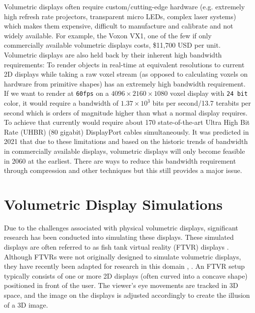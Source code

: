 Volumetric displays often require custom/cutting-edge hardware (e.g. extremely high refresh rate projectors,  transparent micro LEDs, complex laser systems) which makes them expensive, difficult to manufacture and calibrate and not widely available. For example, the Voxon VX1, one of the few if only commercially available volumetric displays costs, \$11,700 USD \cite{noauthor_products_nodate} per unit. \\

Volumetric displays are also held back by their inherent high bandwidth requirements: To render objects in real-time at equivalent resolutions to current 2D displays while taking a raw voxel stream (as opposed to calculating voxels on hardware from primitive shapes) has an extremely high bandwidth requirement. If we want to render at \texttt{60fps} on a $4096 \times 2160 \times 1080$ voxel display with \texttt{24 bit} color, it would require a bandwidth of $1.37 \times 10^3$ bits per second/13.7 terabits per second which is orders of magnitude higher than what a normal display requires. To achieve that currently would require about 170 state-of-the-art Ultra High Bit Rate (UHBR) (80 gigabit) DisplayPort cables simultaneously. It was predicted in 2021 \cite{LAM2021050011} that due to these limitations and based on the historic trends of bandwidth in commercially available displays, volumetric displays will only become feasible in 2060 at the earliest. There are ways to reduce this bandwidth requirement through compression and other techniques \cite{4487481} but this still provides a major issue. 

\section{Volumetric Display Simulations}
Due to the challenges associated with physical volumetric displays, significant research has been conducted into simulating these displays. These simulated displays are often referred to as fish tank virtual reality (FTVR) displays \cite{10.1145/169059.169066}. Although FTVRs were not originally designed to simulate volumetric displays, they have recently been adapted for research in this domain \cite{10.1145/3281505.3281540}, \cite{Zabarauskas2012}. An FTVR setup typically consists of one or more 2D displays (often curved into a concave shape) positioned in front of the user. The viewer's eye movements are tracked in 3D space, and the image on the displays is adjusted accordingly to create the illusion of a 3D image. \\

